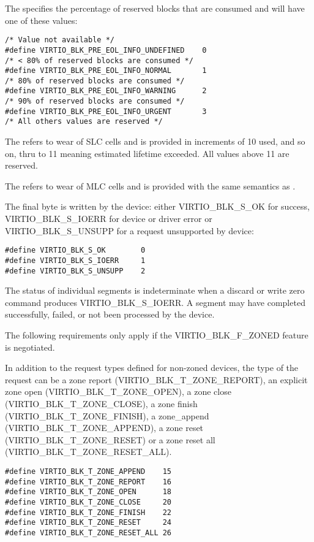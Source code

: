 The  specifies the percentage of reserved blocks
that are consumed and will have one of these values:

\begin{lstlisting}
/* Value not available */
#define VIRTIO_BLK_PRE_EOL_INFO_UNDEFINED    0
/* < 80% of reserved blocks are consumed */
#define VIRTIO_BLK_PRE_EOL_INFO_NORMAL       1
/* 80% of reserved blocks are consumed */
#define VIRTIO_BLK_PRE_EOL_INFO_WARNING      2
/* 90% of reserved blocks are consumed */
#define VIRTIO_BLK_PRE_EOL_INFO_URGENT       3
/* All others values are reserved */
\end{lstlisting}

The  refers to wear of SLC cells and is provided
in increments of 10%
used, and so on, thru to 11 meaning estimated lifetime exceeded.
All values above 11 are reserved.

The  refers to wear of MLC cells and is provided
with the same semantics as .

The final  byte is written by the device: either
VIRTIO_BLK_S_OK for success, VIRTIO_BLK_S_IOERR for device or driver
error or VIRTIO_BLK_S_UNSUPP for a request unsupported by device:

\begin{lstlisting}
#define VIRTIO_BLK_S_OK        0
#define VIRTIO_BLK_S_IOERR     1
#define VIRTIO_BLK_S_UNSUPP    2
\end{lstlisting}

The status of individual segments is indeterminate when a discard or write zero
command produces VIRTIO_BLK_S_IOERR.  A segment may have completed
successfully, failed, or not been processed by the device.

The following requirements only apply if the VIRTIO_BLK_F_ZONED feature is
negotiated.

In addition to the request types defined for non-zoned devices, the type of the
request can be a zone report (VIRTIO_BLK_T_ZONE_REPORT), an explicit zone open
(VIRTIO_BLK_T_ZONE_OPEN), a zone close (VIRTIO_BLK_T_ZONE_CLOSE), a zone finish
(VIRTIO_BLK_T_ZONE_FINISH), a zone_append (VIRTIO_BLK_T_ZONE_APPEND), a zone
reset (VIRTIO_BLK_T_ZONE_RESET) or a zone reset all
(VIRTIO_BLK_T_ZONE_RESET_ALL).

\begin{lstlisting}
#define VIRTIO_BLK_T_ZONE_APPEND    15
#define VIRTIO_BLK_T_ZONE_REPORT    16
#define VIRTIO_BLK_T_ZONE_OPEN      18
#define VIRTIO_BLK_T_ZONE_CLOSE     20
#define VIRTIO_BLK_T_ZONE_FINISH    22
#define VIRTIO_BLK_T_ZONE_RESET     24
#define VIRTIO_BLK_T_ZONE_RESET_ALL 26
\end{lstlisting}

